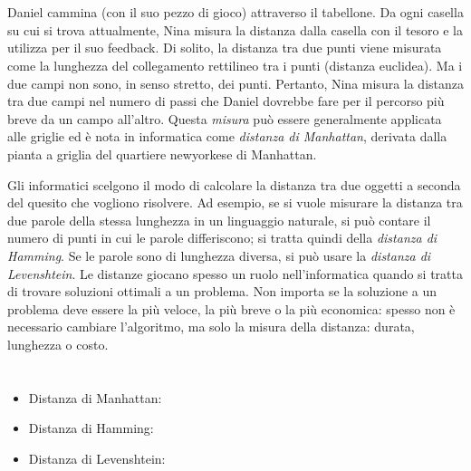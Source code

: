 {{%
\section*{\BrochureItsInformatics}
Daniel cammina (con il suo pezzo di gioco) attraverso il tabellone. Da ogni casella su cui si trova attualmente, Nina misura la distanza dalla casella con il tesoro e la utilizza per il suo feedback.  Di solito, la distanza tra due punti viene misurata come la lunghezza del collegamento rettilineo tra i punti (distanza euclidea).  Ma i due campi non sono, in senso stretto, dei punti. Pertanto, Nina misura la distanza tra due campi nel numero di passi che Daniel dovrebbe fare per il percorso più breve da un campo all’altro.  Questa \emph{misura} può essere generalmente applicata alle griglie ed è nota in informatica come \emph{distanza di Manhattan}, derivata dalla pianta a griglia del quartiere newyorkese di Manhattan.

Gli informatici scelgono il modo di calcolare la distanza tra due oggetti a seconda del quesito che vogliono risolvere. Ad esempio, se si vuole misurare la distanza tra due parole della stessa lunghezza in un linguaggio naturale, si può contare il numero di punti in cui le parole differiscono; si tratta quindi della \emph{distanza di Hamming}.  Se le parole sono di lunghezza diversa, si può usare la \emph{distanza di Levenshtein}. Le distanze giocano spesso un ruolo nell’informatica quando si tratta di trovare soluzioni ottimali a un problema.  Non importa se la soluzione a un problema deve essere la più veloce, la più breve o la più economica:  spesso non è necessario cambiare l’algoritmo, ma solo la misura della distanza: durata, lunghezza o costo.



\section*{\BrochureWebsitesAndKeywords}
{\raggedright
\begin{itemize}
  \item Distanza di Manhattan: \href{https://it.wikipedia.org/wiki/Geometria_del_taxi}{}
  \item Distanza di Hamming: \href{https://it.wikipedia.org/wiki/Distanza_di_Hamming}{}
  \item Distanza di Levenshtein: \href{https://it.wikipedia.org/wiki/Distanza_di_Levenshtein}{}
\end{itemize}


}}}
